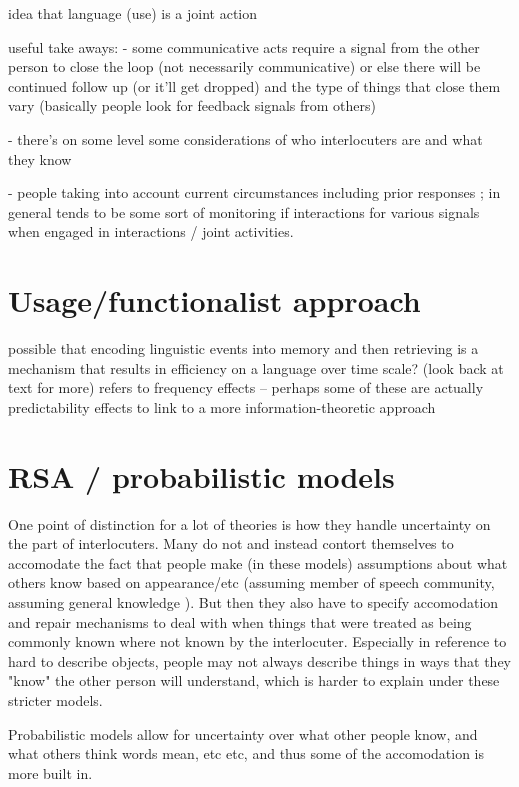 \documentclass[]{article}
\begin{document}

\cite{clark1996} idea that language (use) is a joint action

\cite{clark1996} useful take aways: - some communicative acts require a signal from the other person to close the loop (not necessarily communicative) or else there will be continued follow up (or it’ll get dropped) and the type of things that close them vary (basically people look for feedback signals from others)

- there’s on some level some considerations of who interlocuters are and what they know

- people taking into account current circumstances including prior responses ; in general tends to be some sort of monitoring if interactions for various signals when engaged in interactions / joint activities.

\section{Usage/functionalist approach}

\cite{bybee2006} possible that encoding linguistic events into memory and then retrieving is a mechanism that results in efficiency on a language over time scale? (look back at text for more) 
refers to frequency effects -- perhaps some of these are actually predictability effects to link to a more information-theoretic approach 


\section{RSA / probabilistic models }

One point of distinction for a lot of theories is how they handle uncertainty on the part of interlocuters. Many do not and instead contort themselves to accomodate the fact that people make (in these models) assumptions about what others know based on appearance/etc (assuming member of speech community, assuming general knowledge ). But then they also have to specify accomodation and repair mechanisms to deal with when things that were treated as being commonly known where not known by the interlocuter. Especially in reference to hard to describe objects, people may not always describe things in ways that they "know" the other person will understand, which is harder to explain under these stricter models. 

Probabilistic models allow for uncertainty over what other people know, and what others think words mean, etc etc, and thus some of the accomodation is more built in. 
\end{document}
